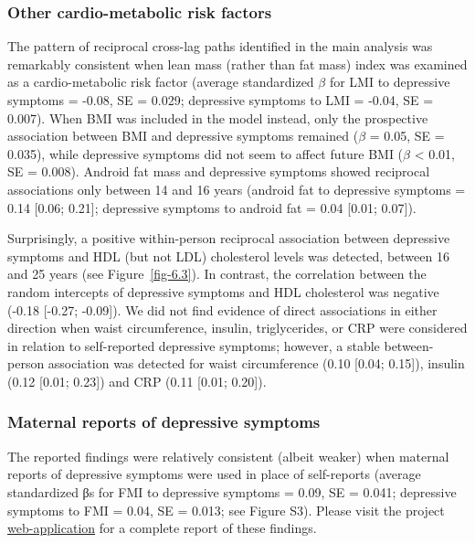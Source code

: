 \documentclass[
  letterpaper,
  DIV=11,
  numbers=noendperiod]{scrreport}
\begin{document}
\subsubsection{Other cardio-metabolic risk
factors}\label{other-cardio-metabolic-risk-factors}

The pattern of reciprocal cross-lag paths identified in the main
analysis was remarkably consistent when lean mass (rather than fat mass)
index was examined as a cardio-metabolic risk factor (average
standardized \(β\) for LMI to depressive symptoms = -0.08, SE = 0.029;
depressive symptoms to LMI = -0.04, SE = 0.007). When BMI was included
in the model instead, only the prospective association between BMI and
depressive symptoms remained (\(β\) = 0.05, SE = 0.035), while
depressive symptoms did not seem to affect future BMI (\(β\) \textless{}
0.01, SE = 0.008). Android fat mass and depressive symptoms showed
reciprocal associations only between 14 and 16 years (android fat to
depressive symptoms = 0.14 {[}0.06; 0.21{]}; depressive symptoms to
android fat = 0.04 {[}0.01; 0.07{]}).

Surprisingly, a positive within-person reciprocal association between
depressive symptoms and HDL (but not LDL) cholesterol levels was
detected, between 16 and 25 years (see Figure~\ref{fig-6.3}). In
contrast, the correlation between the random intercepts of depressive
symptoms and HDL cholesterol was negative (-0.18 {[}-0.27; -0.09{]}). We
did not find evidence of direct associations in either direction when
waist circumference, insulin, triglycerides, or CRP were considered in
relation to self-reported depressive symptoms; however, a stable
between-person association was detected for waist circumference (0.10
{[}0.04; 0.15{]}), insulin (0.12 {[}0.01; 0.23{]}) and CRP (0.11
{[}0.01; 0.20{]}).

\subsubsection{Maternal reports of depressive
symptoms}\label{maternal-reports-of-depressive-symptoms}

The reported findings were relatively consistent (albeit weaker) when
maternal reports of depressive symptoms were used in place of
self-reports (average standardized βs for FMI to depressive symptoms =
0.09, SE = 0.041; depressive symptoms to FMI = 0.04, SE = 0.013; see
Figure S3). Please visit the project
\href{https://longit-comorbidity.onrender.com}{web-application} for a
complete report of these findings.
\end{document}
